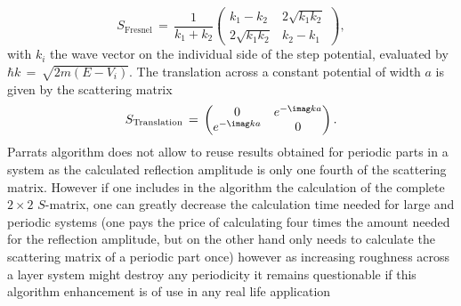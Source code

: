 \documentclass[\main/dresen_thesis.tex]{subfiles}
\begin{document}
    \begin{equation}
    S_\mathrm{Fresnel} \, = \, \frac{1}{k_1+k_2} \begin{pmatrix}
    k_1-k_2& 2 \sqrt{k_1 k_2}\\
    2 \sqrt{k_1 k_2} & k_2 - k_1
    \end{pmatrix},
    \end{equation}
    with $k_i$ the wave vector on the individual side of the step potential, evaluated by $\hbar k\,=\,\sqrt{2m(E-V_i)}$.
    The translation across a constant potential of width $a$ is given by the scattering matrix 
    \begin{equation}
    S_\mathrm{Translation} \, = \, \begin{pmatrix}
    0 & e^{-\imag k a}\\
    e^{-\imag k a} & 0
    \end{pmatrix}.
    \end{equation}
    Parrats algorithm does not allow to reuse results obtained for periodic parts in a system as the calculated reflection amplitude is only one fourth of the scattering matrix. However if one includes in the algorithm the calculation of the complete $2\times2$ $S$-matrix, one can greatly decrease the calculation time needed for large and periodic systems (one pays the price of calculating four times the amount needed for the reflection amplitude, but on the other hand only needs to calculate the scattering matrix of a periodic part once)
    however as increasing roughness across a layer system might destroy any periodicity it remains questionable if this algorithm enhancement is of use in any real life application
\end{document}
